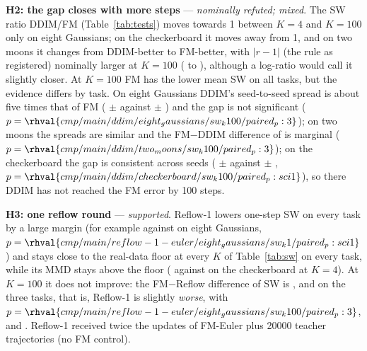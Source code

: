 \textbf{H2: the gap closes with more steps} --- \emph{nominally refuted; mixed}. The SW ratio DDIM/FM (Table~\ref{tab:tests}) moves towards 1 between $K{=}4$ and $K{=}100$ only on eight Gaussians; on the checkerboard it moves away from 1, and on two moons it changes from DDIM-better to FM-better, with $|r-1|$ (the rule as registered) nominally larger at $K{=}100$ ( to ), although a log-ratio would call it slightly closer. At $K{=}100$ FM has the lower mean SW on all tasks, but the evidence differs by task. On eight Gaussians DDIM's seed-to-seed spread is about five times that of FM ( $\pm$  against  $\pm$ ) and the gap is not significant ($p=\rhval{cmp/main/ddim/eight_gaussians/sw_k100/paired_p:3}$); on two moons the spreads are similar and the FM$-$DDIM difference of  is marginal ($p=\rhval{cmp/main/ddim/two_moons/sw_k100/paired_p:3}$); on the checkerboard the gap is consistent across seeds ( $\pm$  against  $\pm$ , $p=\rhval{cmp/main/ddim/checkerboard/sw_k100/paired_p:sci1}$), so there DDIM has not reached the FM error by 100 steps.

\textbf{H3: one reflow round} --- \emph{supported}. Reflow-1 lowers one-step SW on every task by a large margin (for example  against  on eight Gaussians, $p=\rhval{cmp/main/reflow-1-euler/eight_gaussians/sw_k1/paired_p:sci1}$) and stays close to the real-data floor at every $K$ of Table~\ref{tab:sw} on every task, while its MMD stays above the floor ( against  on the checkerboard at $K{=}4$). At $K{=}100$ it does not improve: the FM$-$Reflow difference of SW is ,  and  on the three tasks, that is, Reflow-1 is slightly \emph{worse}, with $p=\rhval{cmp/main/reflow-1-euler/eight_gaussians/sw_k100/paired_p:3}$,  and . Reflow-1 received twice the updates of FM-Euler plus 20000 teacher trajectories (no FM control).

